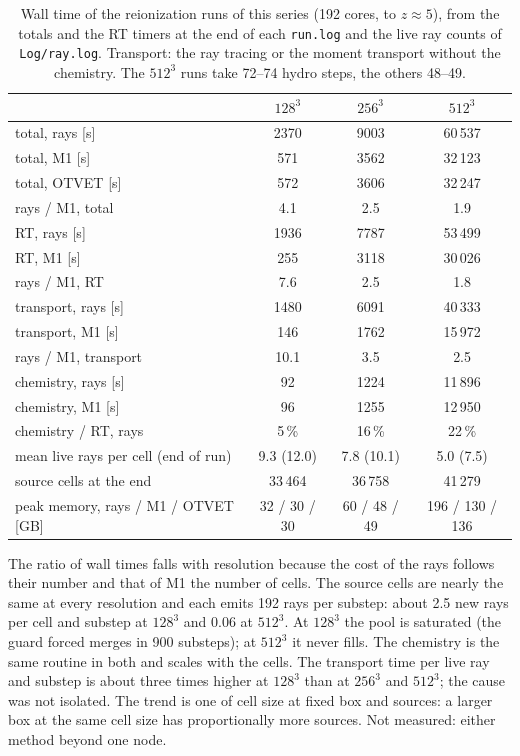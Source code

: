 \documentclass[11pt]{article}
\begin{document}
\begin{table}
\centering
\caption{Wall time of the reionization runs of this series (192 cores, to $z\approx5$), from the totals and the
RT timers at the end of each \texttt{run.log} and the live ray counts of \texttt{Log/ray.log}. Transport: the ray
tracing or the moment transport without the chemistry. The $512^3$ runs take 72--74 hydro steps, the others 48--49.}
\label{tab:cost}
\begin{tabular}{lccc}
\toprule
 & $128^3$ & $256^3$ & $512^3$\\
\midrule
total, rays [s] & 2370 & 9003 & 60\,537\\
total, M1 [s] & 571 & 3562 & 32\,123\\
total, OTVET [s] & 572 & 3606 & 32\,247\\
rays / M1, total & 4.1 & 2.5 & 1.9\\
RT, rays [s] & 1936 & 7787 & 53\,499\\
RT, M1 [s] & 255 & 3118 & 30\,026\\
rays / M1, RT & 7.6 & 2.5 & 1.8\\
transport, rays [s] & 1480 & 6091 & 40\,333\\
transport, M1 [s] & 146 & 1762 & 15\,972\\
rays / M1, transport & 10.1 & 3.5 & 2.5\\
chemistry, rays [s] & 92 & 1224 & 11\,896\\
chemistry, M1 [s] & 96 & 1255 & 12\,950\\
chemistry / RT, rays & 5\,\% & 16\,\% & 22\,\%\\
mean live rays per cell (end of run) & 9.3 (12.0) & 7.8 (10.1) & 5.0 (7.5)\\
source cells at the end & 33\,464 & 36\,758 & 41\,279\\
peak memory, rays / M1 / OTVET [GB] & 32 / 30 / 30 & 60 / 48 / 49 & 196 / 130 / 136\\
\bottomrule
\end{tabular}
\end{table}

The ratio of wall times falls with resolution because the cost of the rays follows their number and that of M1
the number of cells. The source cells are nearly the same at every resolution and each emits 192 rays per substep:
about 2.5 new rays per cell and substep at $128^3$ and 0.06 at $512^3$. At $128^3$ the pool is saturated (the
guard forced merges in 900 substeps); at $512^3$ it never fills. The chemistry is the same routine in both and
scales with the cells. The transport time per live ray and substep is about three times higher at $128^3$ than at
$256^3$ and $512^3$; the cause was not isolated. The trend is one of cell size at fixed box and sources: a larger
box at the same cell size has proportionally more sources. Not measured: either method beyond one node.
\end{document}
